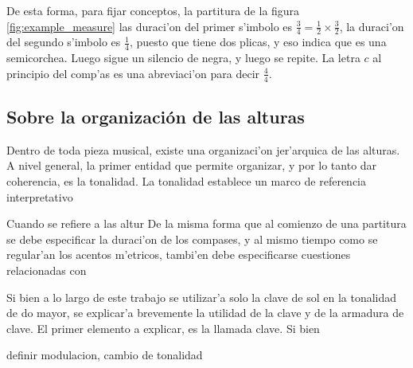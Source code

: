 De esta forma, para fijar conceptos, la partitura de la figura \ref{fig:example_measure} las duraci'on del primer s'imbolo es $\frac{3}{4}=\frac{1}{2}\times\frac{3}{2}$,
la duraci'on del segundo s'imbolo es $\frac{1}{4}$, puesto que tiene dos plicas, y eso indica que es una semicorchea. Luego sigue un silencio de negra, y luego se 
repite. La letra $c$ al principio del comp'as es una abreviaci'on para decir $\frac{4}{4}$.

\begin{imagen}
\end{imagen}

\subsection{Sobre la organizaci\'on de las alturas}
Dentro de toda pieza musical, existe una organizaci'on jer'arquica de las alturas. A nivel general, la primer entidad que permite organizar, y por lo tanto dar 
coherencia, es la tonalidad. La tonalidad establece un marco de referencia interpretativo  

Cuando se refiere a las altur
De la misma forma que al comienzo de una partitura se debe especificar la duraci'on de los compases, y al mismo tiempo como se regular'an los acentos m'etricos,
tambi'en debe especificarse cuestiones relacionadas con 

Si bien a lo largo de este trabajo se utilizar'a solo la clave de sol en la tonalidad de do mayor, se explicar'a brevemente la utilidad de la clave y de la armadura
de clave.
El primer elemento a explicar, es la llamada clave. Si bien 

definir modulacion, cambio de tonalidad 

